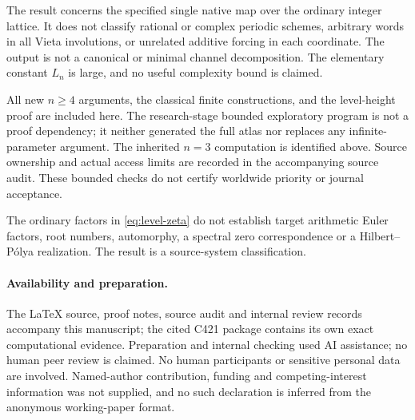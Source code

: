 The result concerns the specified single native map over the
ordinary integer lattice. It does not classify rational or complex
periodic schemes, arbitrary words in all Vieta involutions, or
unrelated additive forcing in each coordinate. The output is not
a canonical or minimal channel decomposition. The elementary
constant $L_n$ is large, and no useful complexity bound is claimed.

All new $n\ge4$ arguments, the classical finite constructions,
and the level-height proof are included here. The research-stage
bounded exploratory program is not a proof dependency; it neither
generated the full atlas nor replaces any infinite-parameter
argument. The inherited $n=3$ computation is identified above.
Source ownership and actual access limits are recorded in the
accompanying source audit. These bounded checks do not certify
worldwide priority or journal acceptance.

The ordinary factors in \eqref{eq:level-zeta} do not establish
target arithmetic Euler factors, root numbers, automorphy, a
spectral zero correspondence or a Hilbert--P\'olya realization.
The result is a source-system classification.

\paragraph{Availability and preparation.}
The LaTeX source, proof notes, source audit and internal review
records accompany this manuscript; the cited C421 package contains
its own exact computational evidence. Preparation and internal
checking used AI assistance; no human peer review is claimed.
No human participants or sensitive personal data are involved.
Named-author contribution, funding and competing-interest
information was not supplied, and no such declaration is inferred
from the anonymous working-paper format.
